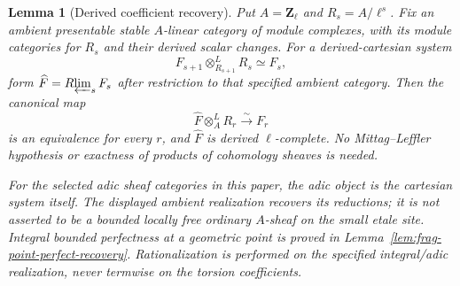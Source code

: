 \documentclass[11pt]{article}
\newtheorem{lemma}[theorem]{Lemma}
\theoremstyle{definition}
\theoremstyle{remark}
\begin{document}
\begin{lemma}[Derived coefficient recovery]
\label{lem:frag-adic-completion}
Put $A=\mathbf Z_\ell$ and $R_s=A/\ell^s$.  Fix an ambient
presentable stable $A$-linear category of module complexes, with its
module categories for $R_s$ and their derived scalar changes.
For a derived-cartesian system
\[
 F_{s+1}\otimes^L_{R_{s+1}}R_s\simeq F_s,
\]
form $\widehat F=R\!\varprojlim_sF_s$ after restriction to that
specified ambient category.  Then the canonical map
\[
 \widehat F\otimes^L_A R_r\xrightarrow{\sim}F_r
\]
is an equivalence for every $r$, and $\widehat F$ is derived
$\ell$-complete.  No Mittag--Leffler hypothesis or exactness of
products of cohomology sheaves is needed.

For the selected adic sheaf categories in this paper, the adic
object is the cartesian system itself.  The displayed ambient
realization recovers its reductions; it is not asserted to be a
bounded locally free ordinary $A$-sheaf on the small etale site.
Integral bounded perfectness at a geometric point is proved in
Lemma~\ref{lem:frag-point-perfect-recovery}.  Rationalization is
performed on the specified integral/adic realization, never
termwise on the torsion coefficients.
\end{lemma}
\end{document}
